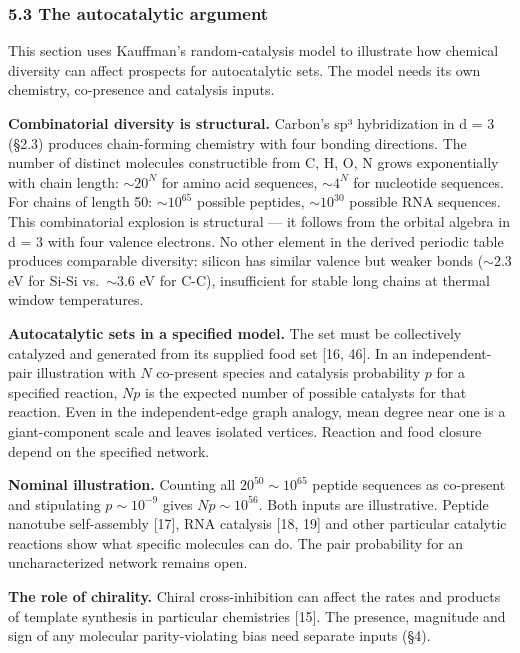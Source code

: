 \documentclass[
]{article}
\begin{document}
\hypertarget{the-autocatalytic-argument}{%
\subsubsection{5.3 The autocatalytic
argument}\label{the-autocatalytic-argument}}

This section uses Kauffman's random-catalysis model to illustrate how
chemical diversity can affect prospects for autocatalytic sets. The
model needs its own chemistry, co-presence and catalysis inputs.

\textbf{Combinatorial diversity is structural.} Carbon's sp³
hybridization in d = 3 (§2.3) produces chain-forming chemistry with four
bonding directions. The number of distinct molecules constructible from
C, H, O, N grows exponentially with chain length: \(\sim 20^N\) for
amino acid sequences, \(\sim 4^N\) for nucleotide sequences. For chains
of length 50: \(\sim 10^{65}\) possible peptides, \(\sim 10^{30}\)
possible RNA sequences. This combinatorial explosion is structural ---
it follows from the orbital algebra in d = 3 with four valence
electrons. No other element in the derived periodic table produces
comparable diversity: silicon has similar valence but weaker bonds
(\(\sim 2.3\) eV for Si-Si vs.~\(\sim 3.6\) eV for C-C), insufficient
for stable long chains at thermal window temperatures.

\textbf{Autocatalytic sets in a specified model.} The set must be
collectively catalyzed and generated from its supplied food set {[}16,
46{]}. In an independent-pair illustration with \(N\) co-present species
and catalysis probability \(p\) for a specified reaction, \(Np\) is the
expected number of possible catalysts for that reaction. Even in the
independent-edge graph analogy, mean degree near one is a
giant-component scale and leaves isolated vertices. Reaction and food
closure depend on the specified network.

\textbf{Nominal illustration.} Counting all \(20^{50}\sim 10^{65}\)
peptide sequences as co-present and stipulating \(p\sim 10^{-9}\) gives
\(Np\sim 10^{56}\). Both inputs are illustrative. Peptide nanotube
self-assembly {[}17{]}, RNA catalysis {[}18, 19{]} and other particular
catalytic reactions show what specific molecules can do. The pair
probability for an uncharacterized network remains open.

\textbf{The role of chirality.} Chiral cross-inhibition can affect the
rates and products of template synthesis in particular chemistries
{[}15{]}. The presence, magnitude and sign of any molecular
parity-violating bias need separate inputs (§4).
\end{document}
